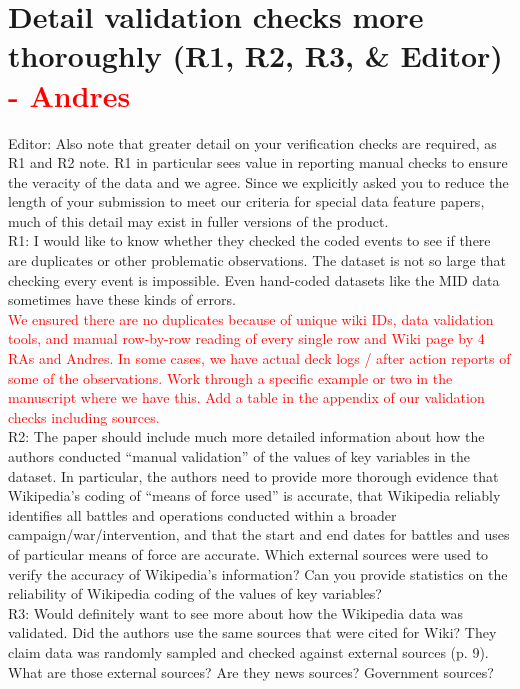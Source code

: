 \documentclass[fleqn,12pt]{article}
\begin{document}
\section{Detail validation checks more thoroughly (R1, R2, R3, \& Editor) \textcolor{red}{- Andres}}
    Editor: Also note that greater detail on your verification checks are required, as R1 and R2 note.  R1 in particular sees value in reporting manual checks to ensure the veracity of the data and we agree.  Since we explicitly asked you to reduce the length of your submission to meet our criteria for special data feature papers, much of this detail may exist in fuller versions of the product. \\
    
    \noindent 
    R1: I would like to know whether they checked the coded events to see if there are duplicates or other problematic observations. The dataset is not so large that checking every event is impossible. Even hand-coded datasets like the MID data sometimes have these kinds of errors. \\
    
    \textcolor{red}{We ensured there are no duplicates because of unique wiki IDs, data validation tools, and manual row-by-row reading of every single row and Wiki page by 4 RAs and Andres. In some cases, we have actual deck logs / after action reports of some of the observations. Work through a specific example or two in the manuscript where we have this. Add a table in the appendix of our validation checks including sources.}\\
    
    \noindent
    R2: The paper should include much more detailed information about how the authors conducted “manual validation” of the values of key variables in the dataset. In particular, the authors need to provide more thorough evidence that Wikipedia’s coding of “means of force used” is accurate, that Wikipedia reliably identifies all battles and operations conducted within a broader campaign/war/intervention, and that the start and end dates for battles and uses of particular means of force are accurate. Which external sources were used to verify the accuracy of Wikipedia’s information? Can you provide statistics on the reliability of Wikipedia coding of the values of key variables? \\
    
    \noindent 
    R3: Would definitely want to see more about how the Wikipedia data was validated. Did the authors use the same sources that were cited for Wiki? They claim data was randomly sampled and checked against external sources (p. 9). What are those external sources? Are they news sources? Government sources? \\
\end{document}
